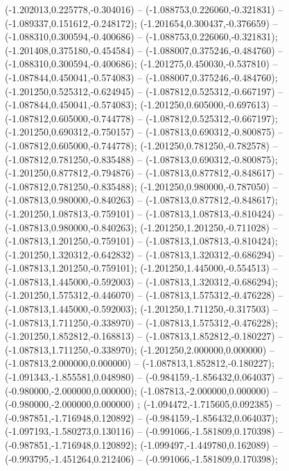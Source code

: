  (-1.202013,0.225778,-0.304016) -- (-1.088753,0.226060,-0.321831) -- (-1.089337,0.151612,-0.248172);
 (-1.201654,0.300437,-0.376659) -- (-1.088310,0.300594,-0.400686) -- (-1.088753,0.226060,-0.321831);
 (-1.201408,0.375180,-0.454584) -- (-1.088007,0.375246,-0.484760) -- (-1.088310,0.300594,-0.400686);
 (-1.201275,0.450030,-0.537810) -- (-1.087844,0.450041,-0.574083) -- (-1.088007,0.375246,-0.484760);
 (-1.201250,0.525312,-0.624945) -- (-1.087812,0.525312,-0.667197) -- (-1.087844,0.450041,-0.574083);
 (-1.201250,0.605000,-0.697613) -- (-1.087812,0.605000,-0.744778) -- (-1.087812,0.525312,-0.667197);
 (-1.201250,0.690312,-0.750157) -- (-1.087813,0.690312,-0.800875) -- (-1.087812,0.605000,-0.744778);
 (-1.201250,0.781250,-0.782578) -- (-1.087812,0.781250,-0.835488) -- (-1.087813,0.690312,-0.800875);
 (-1.201250,0.877812,-0.794876) -- (-1.087813,0.877812,-0.848617) -- (-1.087812,0.781250,-0.835488);
 (-1.201250,0.980000,-0.787050) -- (-1.087813,0.980000,-0.840263) -- (-1.087813,0.877812,-0.848617);
 (-1.201250,1.087813,-0.759101) -- (-1.087813,1.087813,-0.810424) -- (-1.087813,0.980000,-0.840263);
 (-1.201250,1.201250,-0.711028) -- (-1.087813,1.201250,-0.759101) -- (-1.087813,1.087813,-0.810424);
 (-1.201250,1.320312,-0.642832) -- (-1.087813,1.320312,-0.686294) -- (-1.087813,1.201250,-0.759101);
 (-1.201250,1.445000,-0.554513) -- (-1.087813,1.445000,-0.592003) -- (-1.087813,1.320312,-0.686294);
 (-1.201250,1.575312,-0.446070) -- (-1.087813,1.575312,-0.476228) -- (-1.087813,1.445000,-0.592003);
 (-1.201250,1.711250,-0.317503) -- (-1.087813,1.711250,-0.338970) -- (-1.087813,1.575312,-0.476228);
 (-1.201250,1.852812,-0.168813) -- (-1.087813,1.852812,-0.180227) -- (-1.087813,1.711250,-0.338970);
 (-1.201250,2.000000,0.000000) -- (-1.087813,2.000000,0.000000) -- (-1.087813,1.852812,-0.180227);
 (-1.091343,-1.855581,0.048980) -- (-0.984159,-1.856432,0.064037) -- (-0.980000,-2.000000,0.000000);
 (-1.087813,-2.000000,0.000000) -- (-0.980000,-2.000000,0.000000) ;
 (-1.094472,-1.715605,0.092385) -- (-0.987851,-1.716948,0.120892) -- (-0.984159,-1.856432,0.064037);
 (-1.097193,-1.580273,0.130116) -- (-0.991066,-1.581809,0.170398) -- (-0.987851,-1.716948,0.120892);
 (-1.099497,-1.449780,0.162089) -- (-0.993795,-1.451264,0.212406) -- (-0.991066,-1.581809,0.170398);
